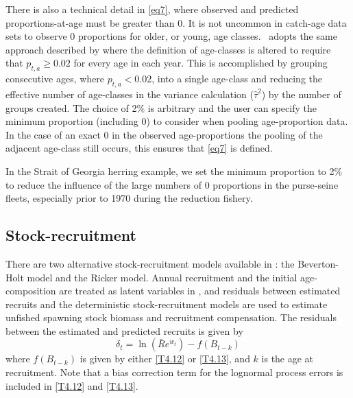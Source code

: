 There is also a technical detail in \eqref{eq7}, where observed and predicted proportions-at-age must be greater than 0.  It is not uncommon in catch-age data sets to observe 0 proportions for older, or young, age classes.  \iscam\ adopts the same approach described by \cite{richards1997visualizing} where the definition of age-classes is altered to require that $p_{t,a}\geq 0.02$ for every age in each year.  This is accomplished by grouping consecutive ages, where $p_{t,a} <0.02$, into a single age-class and reducing the effective number of age-classes in the variance calculation ($\widehat{\tau}^2$) by the number of groups created.  The choice of 2\% is arbitrary and the user can specify the minimum proportion (including 0) to consider when pooling age-proportion data.  In the case of an exact 0 in the observed age-proportions the pooling of the adjacent age-class still occurs, this ensures that \eqref{eq7} is defined.

In the Strait of Georgia herring example, we set the minimum proportion to 2\% to reduce the influence of the large numbers of 0 proportions in the purse-seine fleets, especially prior to 1970 during the reduction fishery.


\subsection{Stock-recruitment}
There are two alternative stock-recruitment models available in \iscam: the Beverton-Holt model and the Ricker model.  Annual recruitment and the initial age-composition are treated as latent variables in \iscam, and residuals between estimated recruits and the deterministic stock-recruitment models are used to estimate unfished spawning stock biomass and recruitment compensation.  The residuals between the estimated and predicted recruits is given by
\begin{equation}\label{eq9}
	\delta_t = \ln(\bar{R}e^{w_t}) - f(B_{t-k})
\end{equation}
where $f(B_{t-k})$ is given by either \eqref{T4.12} or \eqref{T4.13}, and $k$ is the age at recruitment.  Note that a bias correction term for the lognormal process  errors is included in  \eqref{T4.12} and \eqref{T4.13}.

